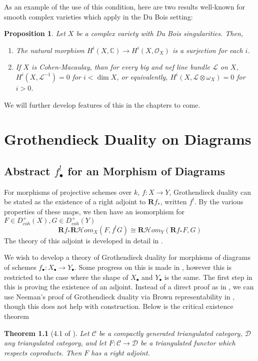 \documentclass{report}
\newtheorem{theorem}{Theorem}[section]
\newtheorem{prop}[theorem]{Proposition}
\theoremstyle{definition}
\newcommand{\cHom}{\mathcal{H} \textit{om}}
\newcommand{\CC}{\mathbb{C}}
\newcommand{\CL}{\mathcal{C}}
\newcommand{\DD}{\mathcal{D}}
\newcommand{\LL}{\mathcal{L}}
\newcommand{\OO}{\mathcal{O}}
\newcommand{\bR}{\textbf{R}}
\begin{document}
As an example of the use of this condition, here are two results well-known for smooth complex varieties which apply in the Du Bois setting:

\begin{prop}
	Let $X$ be a complex variety with Du Bois singularities.
	Then,
	\begin{enumerate}
		\item The natural morphism $H^i(X, \CC) \rightarrow H^i(X, \OO_X)$ is a surjection for each $i$.
		\item If $X$ is Cohen-Macaulay, than for every big and nef line bundle $\LL$ on $X$, $H^i(X, \LL^{-1}) = 0$ for $i < \dim X$, or equivalently, $H^i(X, \LL \otimes \omega_X) = 0$ for $i > 0$.
	\end{enumerate}
\end{prop}

We will further develop features of this in the chapters to come.

\chapter{Grothendieck Duality on Diagrams}
\label{chp:grothendieckduality}

\section{Abstract $f_\bullet^!$ for an Morphism of Diagrams}
For morphisms of projective schemes over $k$, $f : X \rightarrow Y$, Grothendieck duality can be stated as the existence of a right adjoint to $\bR f_*$, written $f^!$.
By the various properties of these maps, we then have an isomorphism for $F \in D_{coh}^+(X), G \in D_{coh}^+(Y)$
\[
\bR f_* \bR \cHom_X(F, f^! G) \cong \bR \cHom_Y(\bR f_* F, G)
\]
The theory of this adjoint is developed in detail in \cite{Hartshorne1966}.

We wish to develop a theory of Grothendieck duality for morphisms of diagrams of schemes $f_\bullet : X_\bullet \rightarrow Y_\bullet$.
Some progress on this is made in \cite{Lipman2009}, however this is restricted to the case where the shape of $X_\bullet$ and $Y_\bullet$ is the same.
The first step in this is proving the existence of an adjoint.
Instead of a direct proof as in \cite{Hartshorne1966}, we can use Neeman's proof of Grothendieck duality via Brown representability in \cite{Neeman1996}, though this does not help with construction.
Below is the critical existence theorem

\begin{theorem}[4.1 of \cite{Neeman1996}]
	\label{thm:neeman4.1}
	Let $\CL$ be a compactly generated triangulated category, $\DD$ any triangulated category, and let $F : \CL \rightarrow \DD$ be a triangulated functor which respects coproducts.
	Then $F$ has a right adjoint.
\end{theorem}
\end{document}
